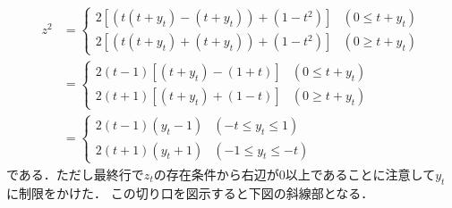 \documentclass[../../main.tex]{subfiles}
\begin{document}
\begin{align}
  z^2
  &=
  \begin{cases}
    2\left[(t(t+y_t)-(t+y_t)) + (1-t^2)\right] & \left(0 \le t+y_t \right) \\
    2\left[(t(t+y_t)+(t+y_t)) + (1-t^2)\right] & \left(0 \ge t+y_t \right)
  \end{cases} \\
  &=
  \begin{cases}
    2(t-1)\left[(t+y_t)-(1+t)\right] & \left(0 \le t+y_t \right) \\
    2(t+1)\left[(t+y_t) + (1-t)\right] & \left(0 \ge t+y_t \right)
  \end{cases} \\
  &=
  \begin{cases}
    2(t-1)(y_t-1) & \left(-t \le y_t \le 1 \right) \\
    2(t+1)(y_t+1) & \left(-1 \le y_t \le -t  \right)
  \end{cases} \label{eq:7}
\end{align}
である．ただし最終行で$z_t$の存在条件から右辺が$0$以上であることに注意して$y_t$に制限をかけた．
この切り口を図示すると下図の斜線部となる．
\end{document}
